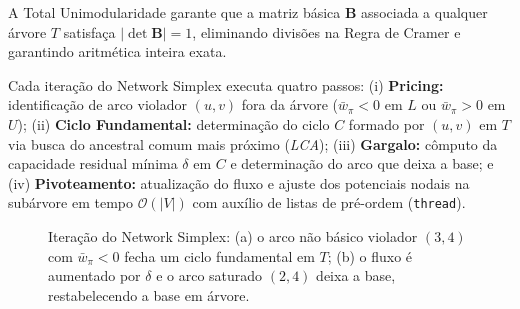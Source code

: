 A Total Unimodularidade garante que a matriz básica $\mathbf{B}$ associada a qualquer árvore $T$ satisfaça $|\det \mathbf{B}| = 1$, eliminando divisões na Regra de Cramer e garantindo aritmética inteira exata.

Cada iteração do Network Simplex executa quatro passos: (i) \textbf{Pricing:} identificação de arco violador $(u, v)$ fora da árvore ($\bar{w}_\pi < 0$ em $L$ ou $\bar{w}_\pi > 0$ em $U$); (ii) \textbf{Ciclo Fundamental:} determinação do ciclo $C$ formado por $(u, v)$ em $T$ via busca do ancestral comum mais próximo (\textit{LCA}); (iii) \textbf{Gargalo:} cômputo da capacidade residual mínima $\delta$ em $C$ e determinação do arco que deixa a base; e (iv) \textbf{Pivoteamento:} atualização do fluxo e ajuste dos potenciais nodais na subárvore em tempo $\mathcal{O}(|V|)$ com auxílio de listas de pré-ordem (\lstinline{thread}).

\begin{figure}[!ht]
\centering

\caption{Iteração do Network Simplex: (a) o arco não básico violador $(3,4)$ com $\bar{w}_\pi < 0$ fecha um ciclo fundamental em $T$; (b) o fluxo é aumentado por $\delta$ e o arco saturado $(2,4)$ deixa a base, restabelecendo a base em árvore.}
\label{fig:simplex_pivoteamento}
\end{figure}
